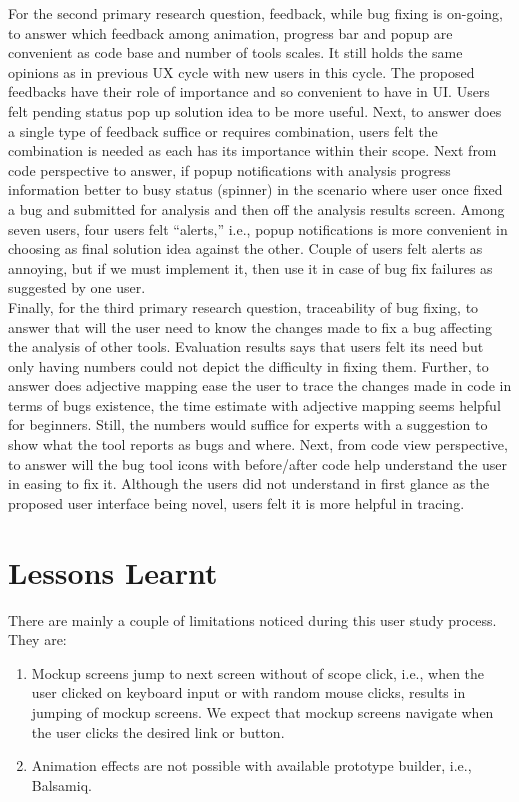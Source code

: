 For the second primary research question, feedback, while bug fixing is on-going, to answer which feedback among animation, progress bar and popup are convenient as code base and number of tools scales. It still holds the same opinions as in previous UX cycle with new users in this cycle. The proposed feedbacks have their role of importance and so convenient to have in UI. Users felt pending status pop up solution idea to be more useful. Next, to answer does a single type of feedback suffice or requires combination, users felt the combination is needed as each has its importance within their scope.  Next from code perspective to answer, if popup notifications with analysis progress information better to busy status (spinner) in the scenario where user once fixed a bug and submitted for analysis and then off the analysis results screen. Among seven users, four users felt “alerts,” i.e., popup notifications is more convenient in choosing as final solution idea against the other. Couple of users felt alerts as annoying, but if we must implement it, then use it in case of bug fix failures as suggested by one user. \\

Finally, for the third primary research question, traceability of bug fixing, to answer that will the user need to know the changes made to fix a bug affecting the analysis of other tools. Evaluation results says that users felt its need but only having numbers could not depict the difficulty in fixing them. Further, to answer does adjective mapping ease the user to trace the changes made in code in terms of bugs existence, the time estimate with adjective mapping seems helpful for beginners. Still, the numbers would suffice for experts with a suggestion to show what the tool reports as bugs and where. Next, from code view perspective, to answer will the bug tool icons with before/after code help understand the user in easing to fix it. Although the users did not understand in first glance as the proposed user interface being novel, users felt it is more helpful in tracing. \\

\section{Lessons Learnt}

There are mainly a couple of limitations noticed during this user study process. They are: \\

\begin{enumerate}
\item Mockup screens jump to next screen without of scope click, i.e., when the user clicked on keyboard input or with random mouse clicks, results in jumping of mockup screens. We expect that mockup screens navigate when the user clicks the desired link or button.
\item Animation effects are not possible with available prototype builder, i.e., Balsamiq. \\
\end{enumerate}


